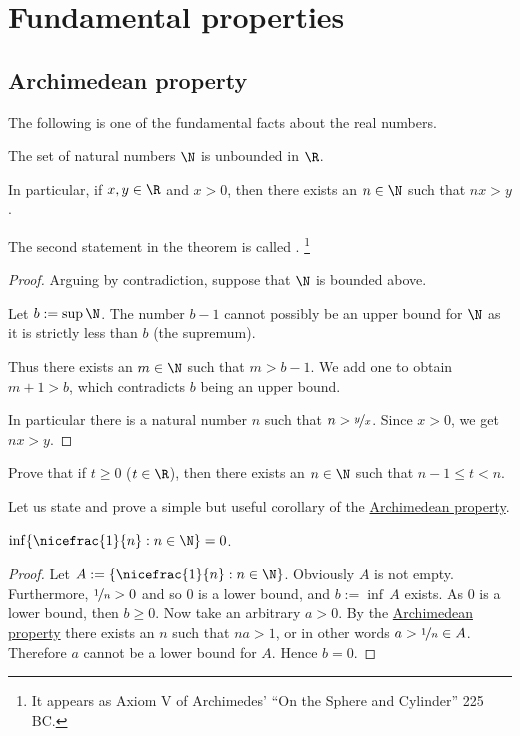 \documentclass[12pt]{book}
\begin{document}
\sectionnewpage
\section{Fundamental properties} \label{sec:Archimedean property}

\subsection*{Archimedean property}

The following is one of the fundamental facts about the real numbers.

\begin{thm}\label{thm:arch:i}
The set of natural numbers $\N$ is unbounded in $\R$.

In particular, if $x, y \in \R$ and
$x > 0$, then there exists an $n \in \N$ such that $nx>y$.
\end{thm}

The second statement in the theorem is called .%
\footnote{It appears as Axiom V of Archimedes' ``On the Sphere and Cylinder'' 225 BC.}


\begin{proof}
Arguing by contradiction, suppose that $\N$ is bounded above.

Let $b := \sup \N$.
The number $b-1$ cannot possibly be an upper bound for $\N$ as it is strictly less than $b$ (the supremum).

Thus there exists an $m \in \N$ such that $m > b-1$.
We add one to obtain $m+1 > b$, which contradicts $b$ being an upper bound.

In particular there is a natural number $n$ such that $n>\nicefrac{y}{x}$.
Since $x>0$, we get $nx>y$.
\end{proof}

\begin{exercise}
Prove that
if $t \geq 0$ ($t \in \R$), then there exists an $n \in \N$ such that $n-1 \leq t < n$.
\end{exercise}

Let us state and prove a simple but useful corollary of the
\hyperref[thm:arch:i]{Archimedean property}.

\begin{cor}
$\inf \{ \nicefrac{1}{n} : n \in \N \} = 0$.
\end{cor}

\begin{proof}
Let $A := \{ \nicefrac{1}{n} : n \in \N \}$.  
Obviously $A$ is not empty.
Furthermore, $\nicefrac{1}{n} > 0$ and so 0 is a lower bound, and $b := \inf\, A$ exists.
As 0 is a lower bound, then $b \geq 0$.
Now take an arbitrary $a > 0$.  
By the \hyperref[thm:arch:i]{Archimedean property} there exists an $n$ such that
$na > 1$, or in other words $a > \nicefrac{1}{n} \in A$.
Therefore
$a$ cannot be a lower bound for $A$.
Hence $b=0$.
\end{proof}
\end{document}
